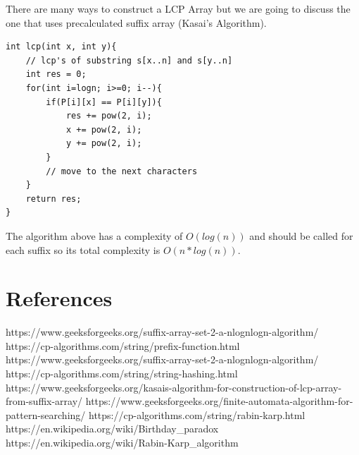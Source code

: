 \documentclass[12pt]{article}
\begin{document}
        There are many ways to construct a LCP Array but we are going to discuss the one that uses precalculated suffix array (Kasai's Algorithm).
        
\begin{verbatim}
int lcp(int x, int y){
    // lcp's of substring s[x..n] and s[y..n]
    int res = 0;
    for(int i=logn; i>=0; i--){
        if(P[i][x] == P[i][y]){
            res += pow(2, i);
            x += pow(2, i);
            y += pow(2, i);
        }
        // move to the next characters
    }
    return res;
}
\end{verbatim}

    The algorithm above has a complexity of $O(log(n))$ and should be called for each suffix so its total complexity is $O(n*log(n))$.
        
       \newpage
       \section{References}
        
        \begin{thebibliography}{0}
            
            https://www.geeksforgeeks.org/suffix-array-set-2-a-nlognlogn-algorithm/
            https://cp-algorithms.com/string/prefix-function.html
            https://www.geeksforgeeks.org/suffix-array-set-2-a-nlognlogn-algorithm/
            https://cp-algorithms.com/string/string-hashing.html
            https://www.geeksforgeeks.org/kasais-algorithm-for-construction-of-lcp-array-from-suffix-array/
            https://www.geeksforgeeks.org/finite-automata-algorithm-for-pattern-searching/
            https://cp-algorithms.com/string/rabin-karp.html
            https://en.wikipedia.org/wiki/Birthday\_paradox
            https://en.wikipedia.org/wiki/Rabin-Karp\_algorithm
        \end{thebibliography}
    
    
\end{document}
